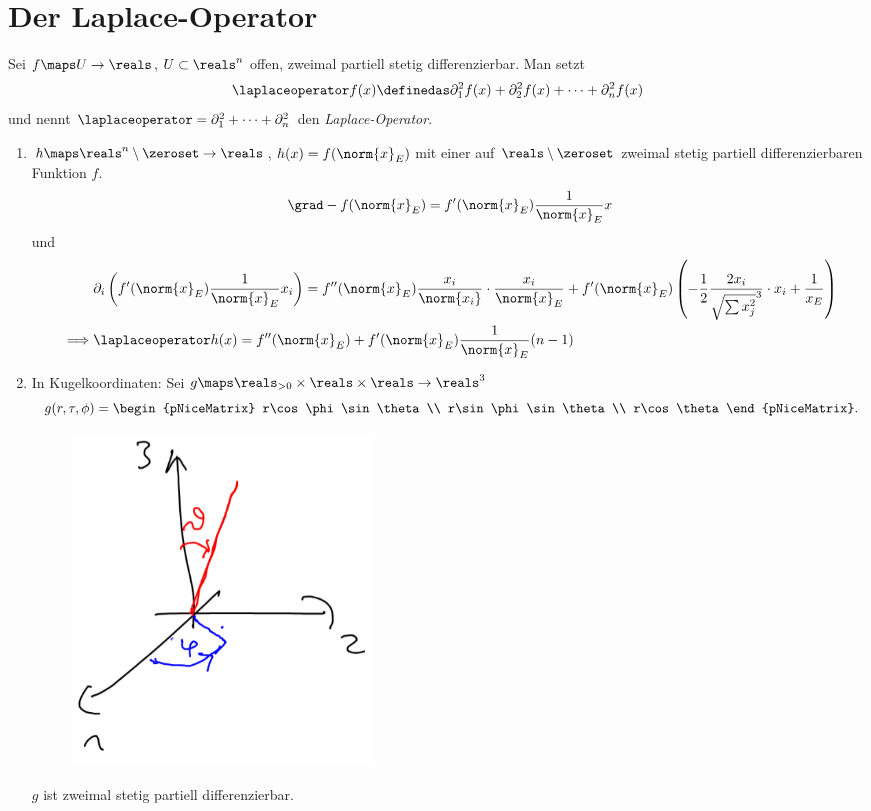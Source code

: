 \section*{Der Laplace-Operator}
Sei \( f\maps U\to \reals \), \( U\subset \reals^n \) offen, zweimal partiell stetig differenzierbar. Man setzt
\begin{equation*}
  \laplaceoperator f(x)\definedas \partial_1^2 f(x)+\partial_2^2 f(x)+\dotsb+\partial_n^2 f(x)
\end{equation*}
und nennt \( \laplaceoperator=\partial_1^2+\dotsb+\partial_n^2 \) den \emph{Laplace-Operator}.
\begin{beispiele*}
  \begin{enumerate}
    \item \( h\maps \reals^n\setminus\zeroset\to \reals \), \( h(x)=f(\norm{x}_E) \) mit einer auf \( \reals\setminus \zeroset \) zweimal stetig partiell differenzierbaren Funktion \( f \).
    \begin{equation*}
      \grad-{f(\norm{x}_E)}=f'(\norm{x}_E)\frac{1}{\norm{x}_E}x
    \end{equation*}
    und
    \begin{align*}
      &\partial_i\left(f'(\norm{x}_E)\frac{1}{\norm{x}_E}x_i \right)=f''(\norm{x}_E)\frac{x_i}{\norm{x_i}}\cdot\frac{x_i}{\norm{x}_E}+f'(\norm{x}_E)\left( -\frac{1}{2}\frac{2x_i}{\sqrt{\sum x_j^2}^3}\cdot x_i +\frac{1}{x_E} \right)\\
      \implies &\laplaceoperator h(x)=f''(\norm{x}_E)+f'(\norm{x}_E)\frac{1}{\norm{x}_E}(n-1)
    \end{align*}
    \item In Kugelkoordinaten: Sei \( g\maps \reals_{>0}\times \reals\times\reals\to \reals^3 \)
    \begin{equation*}
      g(r,\tau,\phi)=\begin{pNiceMatrix} r\cos \phi \sin \theta \\ r\sin \phi \sin \theta \\ r\cos \theta \end{pNiceMatrix}.
    \end{equation*}
    \begin{figure}[H]
      \centering
      \includegraphics[width=0.5\linewidth]{figures/kugelkoordinaten}
      \label{fig:kugelkoordinaten}
    \end{figure}
    \( g \) ist zweimal stetig partiell differenzierbar.


\end{enumerate}
\end{beispiele*}
